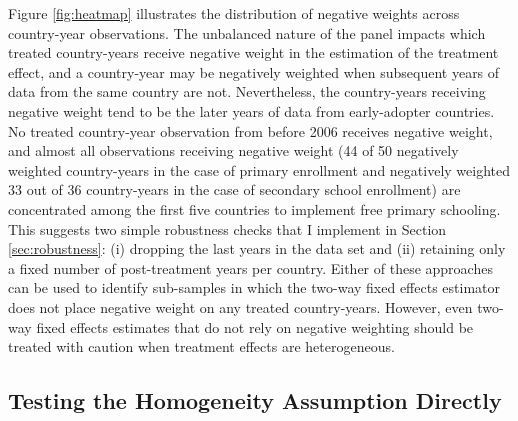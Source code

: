 \documentclass[11pt]{article}
\begin{document}
Figure \ref{fig:heatmap} illustrates the distribution of negative weights across country-year observations.  The unbalanced 
nature of the panel impacts which treated country-years receive negative weight in the estimation of the treatment effect, 
and a country-year may be negatively weighted when subsequent years of data from the same country are not.  Nevertheless, 
the country-years receiving negative weight tend to be the later years of data from early-adopter countries. 
No treated country-year observation 
from before 2006 receives negative weight, and almost all observations receiving negative weight (44 of 50 negatively weighted country-years in the case of 
primary enrollment and negatively weighted 33 out of 36 country-years in the case of secondary school enrollment) 
are concentrated among the first five countries to implement free primary schooling.  This suggests two simple robustness checks 
that I implement in Section \ref{sec:robustness}: (i) dropping the last years in the data set and (ii) retaining only a fixed number of 
post-treatment years per country.  Either of these approaches can be used to identify sub-samples in which the two-way fixed effects 
estimator does not place negative weight on any treated country-years.  However, even two-way fixed effects estimates 
that do not rely on negative weighting should be treated with caution when treatment effects are heterogeneous.   


\subsection{Testing the Homogeneity Assumption Directly}
\end{document}
